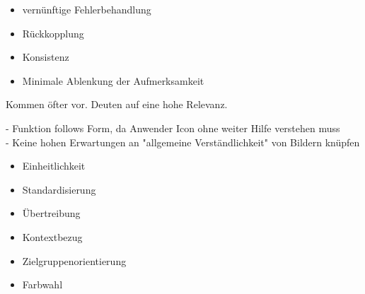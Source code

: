\documentclass[12pt]{article}
\begin{document}
\begin{note}
\end{note}

\begin{note}
    \begin{field}
        \begin{itemize}
            \item vernünftige Fehlerbehandlung
            \item Rückkopplung
            \item Konsistenz
            \item Minimale Ablenkung der Aufmerksamkeit
        \end{itemize}
        Kommen öfter vor. Deuten auf eine hohe Relevanz.
    \end{field}
\end{note}

\begin{note}
    \begin{field} 
         - Funktion follows Form, da Anwender Icon ohne weiter Hilfe verstehen muss \\
         - Keine hohen Erwartungen an "allgemeine Verständlichkeit" von Bildern knüpfen
         \begin{itemize}
            \item Einheitlichkeit
            \item Standardisierung
            \item Übertreibung
            \item Kontextbezug
            \item Zielgruppenorientierung
            \item Farbwahl
        \end{itemize}
    \end{field}
\end{note}
\end{document}
